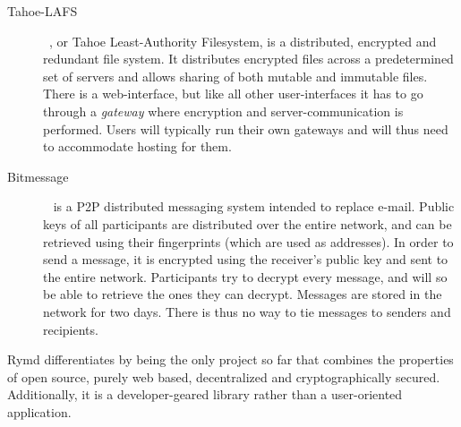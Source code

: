 \begin{description}
  \item[Tahoe-LAFS]~\cite{Tahoe:2014:Online}, or Tahoe Least-Authority Filesystem, is a distributed, encrypted and redundant file system. It distributes encrypted files across a predetermined set of servers and allows sharing of both mutable and immutable files. There is a web-interface, but like all other user-interfaces it has to go through a \emph{gateway} where encryption and server-communication is performed. Users will typically run their own gateways and will thus need to accommodate hosting for them.
  \item[Bitmessage]~\cite{Bitmessage:2014:Online} is a P2P distributed messaging system intended to replace e-mail. Public keys of all participants are distributed over the entire network, and can be retrieved using their fingerprints (which are used as addresses). In order to send a message, it is encrypted using the receiver's public key and sent to the entire network. Participants try to decrypt every message, and will so be able to retrieve the ones they can decrypt. Messages are stored in the network for two days. There is thus no way to tie messages to senders and recipients.

\end{description}

Rymd differentiates by being the only project so far that combines the properties of open source, purely web based, decentralized and cryptographically secured. Additionally, it is a developer-geared library rather than a user-oriented application.
